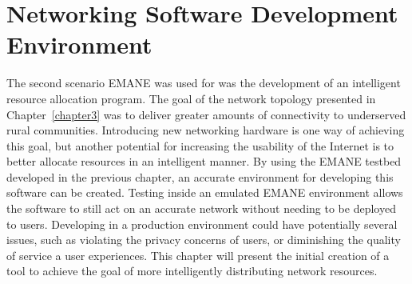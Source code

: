 \chapter{Networking Software Development Environment}
\label{chapter4}
The second scenario EMANE was used for was the development of an intelligent resource allocation program.
The goal of the network topology presented in Chapter~\ref{chapter3} was to deliver greater amounts of connectivity to underserved rural communities.
Introducing new networking hardware is one way of achieving this goal, but another potential for increasing the usability of the Internet is to better allocate resources in an intelligent manner.
By using the EMANE testbed developed in the previous chapter, an accurate environment for developing this software can be created.
Testing inside an emulated EMANE environment allows the software to still act on an accurate network without needing to be deployed to users.
Developing in a production environment could have potentially several issues, such as violating the privacy concerns of users, or diminishing the quality of service a user experiences.
This chapter will present the initial creation of a tool to achieve the goal of more intelligently distributing network resources.

